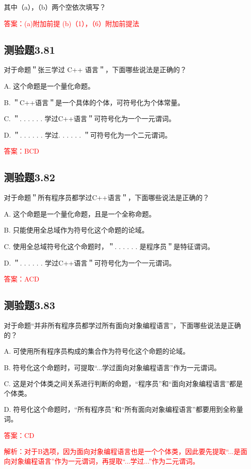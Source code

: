 \documentclass[UTF8, heading=true]{ctexart}
\begin{document}
其中（a），（b）两个空依次填写？

\textcolor{red}{答案：(a)附加前提 (b)（1），（6）附加前提法}

\subsection{测验题3.81}

对于命题＂张三学过 C++ 语言＂，下面哪些说法是正确的？

A. 这个命题是一个量化命题。

B. ＂C++语言＂是一个具体的个体，可符号化为个体常量。

C. ＂. . . . . . 学过C++语言＂可符号化为一个一元谓词。

D. ＂. . . . . . 学过. . . . . . ＂可符号化为一个二元谓词。

\textcolor{red}{答案：BCD}

\subsection{测验题3.82}

对于命题＂所有程序员都学过C++语言＂，下面哪些说法是正确的？

A. 
这个命题是一个量化命题，且是一个全称命题。

B. 
只能使用全总域作为符号化这个命题的论域。

C. 
使用全总域符号化这个命题时，＂. . . . . . 是程序员＂是特征谓词。

D. 
＂. . . . . . 学过C++语言＂可符号化为一个一元谓词。

\textcolor{red}{答案：ACD}

\subsection{测验题3.83}

对于命题“并非所有程序员都学过所有面向对象编程语言”，下面哪些说法是正确的？

A. 可使用所有程序员构成的集合作为符号化这个命题的论域。

B. 符号化这个命题时，可提取“...学过面向对象编程语言”作为一元谓词。

C. 这是对个体类之间关系进行判断的命题，“程序员”和“面向对象编程语言”都是个体类。

D. 符号化这个命题时，“所有程序员”和“所有面向对象编程语言”都要用到全称量词。

\textcolor{red}{答案：CD}

\textcolor{red}{解析：对于B选项，因为面向对象编程语言也是一个个体类，因此要先提取“...是面向对象编程语言”作为一元谓词，再提取“...学过...”作为二元谓词。}
\end{document}
